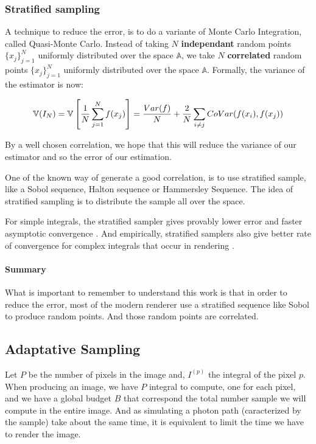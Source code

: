 \documentclass{classeENS}
\begin{document}
\subsubsection{Stratified sampling}

A technique to reduce the error, is to do a variante of Monte Carlo Integration, 
called Quasi-Monte Carlo. Instead of taking $N$ \textbf{independant} random points $\{x_j\}_{j=1}^N$ 
uniformly distributed over the space $\mathbb A$, we take $N$ \textbf{correlated} random 
points $\{x_j\}_{j=1}^N$ uniformly distributed over the space $\mathbb A$. Formally, 
the variance of the estimator is now:
 
\[ \mathbb V(I_N) = \mathbb V\left [\frac{1}{N}\sum_{j=1}^N f(x_j) \right ] = \frac{Var(f)}{N} + \frac{2}{N}\sum_{i\neq j} CoVar(f(x_i),f(x_j)) \]

By a well chosen correlation, we hope that this will reduce the variance of our estimator and so the error
of our estimation. 

\par One of the known way of generate a good correlation, is to use stratified sample, like 
a Sobol sequence, Halton sequence or Hammersley Sequence. The idea
of stratified sampling is to distribute the sample all over the space.

For simple integrals, the stratified sampler gives provably lower error and 
faster asymptotic convergence \cite{10.1145/237170.237265}. And empirically,
stratified samplers also give better rate of convergence for complex integrals that
occur in rendering \cite{renderman}.

\paragraph*{Summary} What is important to remember to understand this work is that 
in order to reduce the error, most of the modern renderer use a stratified sequence like 
Sobol \cite{renderman} to produce random points. And those random points are correlated.

\subsection{Adaptative Sampling}

\par Let $P$ be the number of pixels in the image and, $I^{(p)}$ the integral of the pixel $p$. 
When producing an image, we have $P$ integral to compute, one for each pixel, and we have a
global budget $B$ that correspond the total number sample we will compute in the entire 
image. And as simulating a photon path (caracterized by the sample) take about the 
same time, it is equivalent to limit the time we have to render the image.
\end{document}
